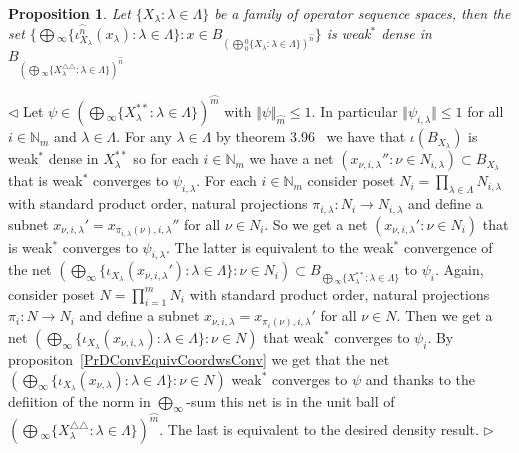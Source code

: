 \documentclass[12pt]{article}
\newtheorem{proposition}[theorem]{Proposition}
\newenvironment{proof}{\par $\triangleleft$}{$\triangleright$}
\begin{document}
\begin{proposition}\label{PrDensSubsetOfSumOfDoubleDuals} 
Let $ \{X_\lambda:\lambda\in\Lambda \}$ be a family of operator sequence spaces, 
then the set 
$ \{
    \bigoplus{}_\infty \{
        \iota_{X_\lambda}^{\wideparen{n}}(x_\lambda):\lambda\in \Lambda
     \}
    :x\in B_{{(\bigoplus{}_0^0 \{
        X_\lambda:\lambda\in \Lambda 
    \})}^{\wideparen{n}}}
 \}$ is weak${}^*$ dense in 
$B_{{(\bigoplus{}_\infty \{
    X_\lambda^{\triangle\triangle}:\lambda\in \Lambda
 \})}^{\wideparen{n}}}$
\end{proposition}
\begin{proof}
Let $\psi\in 
{(\bigoplus{}_\infty \{X_\lambda^{**}:\lambda\in \Lambda \})}^{\wideparen{m}}$ 
with $\Vert\psi\Vert_{\wideparen{m}}\leq 1$. 
In particular $\Vert\psi_{i,\lambda}\Vert\leq 1$ 
for all $i\in\mathbb{N}_m$ and $\lambda\in\Lambda$. 
For any $\lambda\in\Lambda$ by theorem 3.96~\cite{FabZizBanSpTh} 
we have that $\iota(B_{X_\lambda})$ is weak${}^*$ 
dense in $X_\lambda^{**}$ so for each $i\in\mathbb{N}_m$ 
we have a net $(x_{\nu,i,\lambda}'':\nu\in N_{i,\lambda})\subset B_{X_\lambda}$ 
that is weak${}^*$ converges to $\psi_{i,\lambda}$. For each $i\in\mathbb{N}_m$ 
consider poset $N_i=\prod_{\lambda\in\Lambda}N_{i,\lambda}$ 
with standard product order, 
natural projections $\pi_{i,\lambda}:N_i\to N_{i,\lambda}$ and 
define a subnet $x_{\nu,i,\lambda}'=x_{\pi_{i,\lambda}(\nu),i,\lambda}''$ 
for all $\nu\in N_i$. 
So we get a net $(x_{\nu,i,\lambda}':\nu\in N_i)$ that is weak${}^*$ 
converges to $\psi_{i,\lambda}$. The latter is equivalent to the 
weak${}^*$ convergence of the net 
$(\bigoplus_\infty \{
    \iota_{X_\lambda}(x_{\nu,i,\lambda}'):\lambda\in\Lambda
 \}:\nu\in N_i)
\subset B_{\bigoplus{}_\infty \{X_\lambda^{**}:\lambda\in \Lambda \}}$ 
to $\psi_i$. Again, consider poset $N=\prod_{i=1}^m N_i$ 
with standard product order, natural projections $\pi_i:N\to N_i$ 
and define a subnet $x_{\nu,i,\lambda}=x_{\pi_i(\nu),i,\lambda}'$ 
for all $\nu\in N$. Then we get a net 
$(\bigoplus_\infty \{
    \iota_{X_\lambda}(x_{\nu,i,\lambda}):\lambda\in\Lambda
 \}:\nu\in N)$ that weak${}^*$ converges to $\psi_i$. 
By propositon~\ref{PrDConvEquivCoordwsConv} 
we get that the net 
$(\bigoplus_\infty \{
    \iota_{X_\lambda}(x_{\nu,\lambda}):\lambda\in\Lambda
 \}:\nu\in N)$ weak${}^*$ converges to $\psi$ and thanks to  the defiition of 
the norm in $\bigoplus_\infty$-sum this net is in the unit ball of 
${(\bigoplus{}_\infty \{
    X_\lambda^{\triangle\triangle}:\lambda\in \Lambda
 \})}^{\wideparen{m}}$. The last is equivalent to the desired density result. 
\end{proof}
\end{document}
